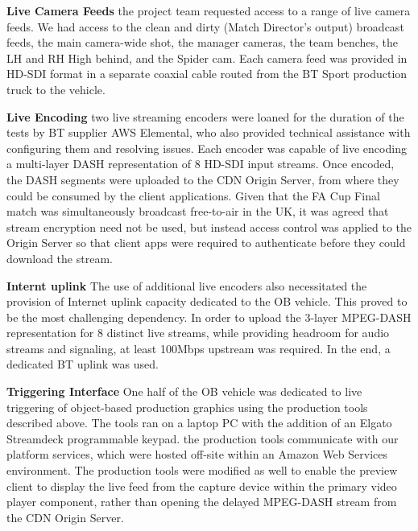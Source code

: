 \documentclass[sigchi-a, authorversion]{acmart}
\begin{document}
\textbf{Live Camera Feeds} the project team requested access to a range of live camera feeds. We had access to the clean and dirty (Match Director's output) broadcast feeds, the main camera-wide shot, the manager cameras, the team benches, the LH and RH High behind, and the Spider cam. Each camera feed was provided in HD-SDI format in a separate coaxial cable routed from the BT Sport production truck to the vehicle.

\textbf{Live Encoding} two live streaming encoders were loaned for the duration of the tests by BT supplier AWS Elemental, who also provided technical assistance with configuring them and resolving issues. Each encoder was capable of live encoding a multi-layer DASH representation of 8 HD-SDI input streams. Once encoded, the DASH segments were uploaded to the CDN Origin Server, from where they could be consumed by the client applications. Given that the FA Cup Final match was simultaneously broadcast free-to-air in the UK, it was agreed that stream encryption need not be used, but instead access control was applied to the Origin Server so that client apps were required to authenticate before they could download the stream.  

\textbf{Internt uplink} The use of additional live encoders also necessitated the provision of Internet uplink capacity dedicated to the OB vehicle. This proved to be the most challenging dependency. In order to upload the 3-layer MPEG-DASH representation for 8 distinct live streams, while providing headroom for audio streams and signaling, at least 100Mbps upstream was required. In the end, a dedicated BT uplink was used.

\textbf{Triggering Interface} One half of the OB vehicle was dedicated to live triggering of object-based production graphics using the production tools described above. The tools ran on a laptop PC with the addition of an Elgato Streamdeck programmable keypad. the production tools communicate with our platform services, which were hosted off-site within an Amazon Web Services environment. The production tools were modified as well to enable the preview client to display the live feed from the capture device within the primary video player component, rather than opening the delayed MPEG-DASH stream from the CDN Origin Server.
\end{document}
